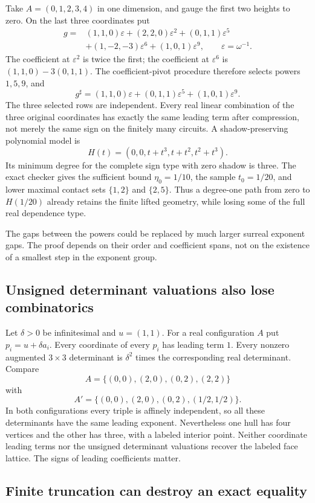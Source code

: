 \documentclass[11pt,a4paper]{article}
\numberwithin{equation}{section}
\theoremstyle{plain}
\newcommand{\eps}{\varepsilon}
\begin{document}
Take $A=(0,1,2,3,4)$ in one dimension, and gauge the first two heights to
zero. On the last three coordinates put
\begin{align*}
 g={}&(1,1,0)\eps+(2,2,0)\eps^2+(0,1,1)\eps^5\\
    &+(1,-2,-3)\eps^6+(1,0,1)\eps^9,
 \qquad \eps=\omega^{-1}.
\end{align*}
The coefficient at $\eps^2$ is twice the first; the coefficient at
$\eps^6$ is $(1,1,0)-3(0,1,1)$. The coefficient-pivot procedure therefore
selects powers $1,5,9$, and
\[
 g^\sharp=(1,1,0)\eps+(0,1,1)\eps^5+(1,0,1)\eps^9.
\]
The three selected rows are independent. Every real linear combination
of the three original coordinates has exactly the same leading term after
compression, not merely the same sign on the finitely many circuits.
A shadow-preserving polynomial model is
\[
 H(t)=(0,0,t+t^3,t+t^2,t^2+t^3).
\]
Its minimum degree for the complete sign type with zero shadow is three.
The exact checker gives the sufficient bound $\eta_0=1/10$, the sample
$t_0=1/20$, and lower maximal contact sets $\{1,2\}$ and $\{2,5\}$.
Thus a degree-one path from zero to $H(1/20)$ already retains the finite
lifted geometry, while losing some of the full real dependence type.

The gaps between the powers could be replaced by much larger surreal
exponent gaps. The proof depends on their order and coefficient spans,
not on the existence of a smallest step in the exponent group.

\subsection{Unsigned determinant valuations also lose combinatorics}

Let $\delta>0$ be infinitesimal and $u=(1,1)$. For a real configuration
$A$ put $p_i=u+\delta a_i$. Every coordinate of every $p_i$ has leading
term $1$. Every nonzero augmented $3\times3$ determinant is
$\delta^2$ times the corresponding real determinant. Compare
\[
 A=\{(0,0),(2,0),(0,2),(2,2)\}
\]
with
\[
 A'=\{(0,0),(2,0),(0,2),(1/2,1/2)\}.
\]
In both configurations every triple is affinely independent, so all these
determinants have the same leading exponent. Nevertheless one hull has
four vertices and the other has three, with a labeled interior point.
Neither coordinate leading terms nor the unsigned determinant valuations
recover the labeled face lattice. The signs of leading coefficients matter.

\subsection{Finite truncation can destroy an exact equality}\label{poly:sec:truncation}
\end{document}
